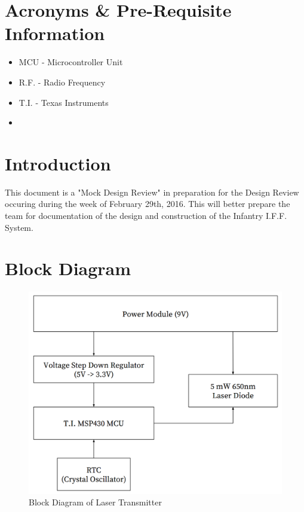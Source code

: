 \documentclass[openbib,letterpaper,10pt]{article}
\newcommand{\buildtoc}{
	\clearpage
	\singlespacing
	\tableofcontents
	\onehalfspacing
}
\begin{document}
\maketitle
\pagestyle{fancy}
\begin{spacing}{1.15}


\color{black}
\buildtoc
{}
\section*{Acronyms \& Pre-Requisite Information}
\begin{itemize}
	\item MCU - Microcontroller Unit
	\item R.F. - Radio Frequency
	\item T.I. - Texas Instruments
	\item 
\end{itemize}
\clearpage
\setcounter{page}{1}

\section{Introduction}
This document is a "Mock Design Review" in preparation for the Design Review occuring during the week of February 29th, 2016. This will better prepare the team for documentation of the design and construction of the Infantry I.F.F. System.

\section{Block Diagram}
\begin{figure} [H]
	\centering
	\includegraphics[scale=0.50]{Block_Diagram.png}
	\caption{Block Diagram of Laser Transmitter\label{fig:circuit-schematic}}
\end{figure}


\end{spacing}
\end{document}
